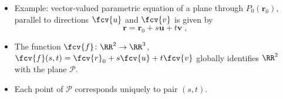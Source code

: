 \begin{frame}
\begin{itemize}
\item Example: vector-valued parametric equation of a plane through $P_0(\textbf{r}_0)$, parallel to directions $\fcv{u}$ and $\fcv{v}$ is given by 
\[\textbf{r} = \textbf{r}_0 + s \textbf{u} +
t \textbf{v}\; ,
\]
\item The function $\fcv{f} \colon \RR^2 \to \RR^3$, $\fcv{f}(s,t) = \fcv{r}_0 + s \fcv{u} + t \fcv{v}$ globally identifies
$\RR^2$ with the plane $\mathcal{P}$.
\item Each point of $\mathcal{P}$ corresponds uniquely to pair $(s,t)$.
\end{itemize}
\end{frame}